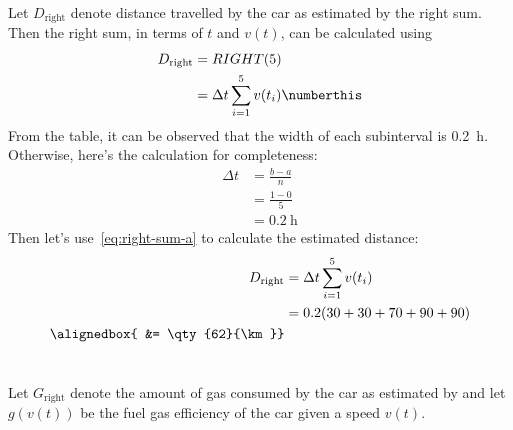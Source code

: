 \documentclass[
  coursecode={APSC 171},
  assignmentname={Week 6 Material - Defining and Estimating Integrals as Areas},
  solutiontitle=Solution,
  nodate,
  draft,
]{
  ltxanswer%
}
\begin{document}
  \begin{questions}
    \setcounter{question}{24}
    \question{}\
    \begin{parts}
      \part{}
      \begin{solution}
        Let \(D_{\text{right}}\) denote distance travelled by the car as estimated by the right sum. Then the right sum, in terms of \(t\) and \(v(t)\), can be calculated using
        \begin{align*}
          D_{\text{right}} &= RIGHT(5)                                                          \\
                           &= \Delta t \sum_{i=1}^{5} v(t_{i})\numberthis\label{eq:right-sum-a}
        \end{align*}
        From the table, it can be observed that the width of each subinterval is \qty{0.2}{\hour}. Otherwise, here's the calculation for completeness:
        \begin{align*}
          \Delta t &= \frac{b-a}{n}    \\
                   &= \frac{1-0}{5}    \\
                   &= \qty{0.2}{\hour}
        \end{align*}
        Then let's use~\eqref{eq:right-sum-a} to calculate the estimated distance:
        \begin{align*}
          D_{\text{right}} &= \Delta t \sum_{i=1}^{5} v(t_{i}) \\
                           &= 0.2 (30 + 30 + 70 + 90 + 90)     \\
          \alignedbox{     &= \qty{62}{\km}}
        \end{align*}
      \end{solution}

      \part{}
      \begin{solution}
        Let \(G_{\text{right}}\) denote the amount of gas consumed by the car as estimated by and let \(g(v(t))\) be the fuel gas efficiency of the car given a speed \(v(t)\).


\end{solution}
\end{parts}
\end{questions}
\end{document}

